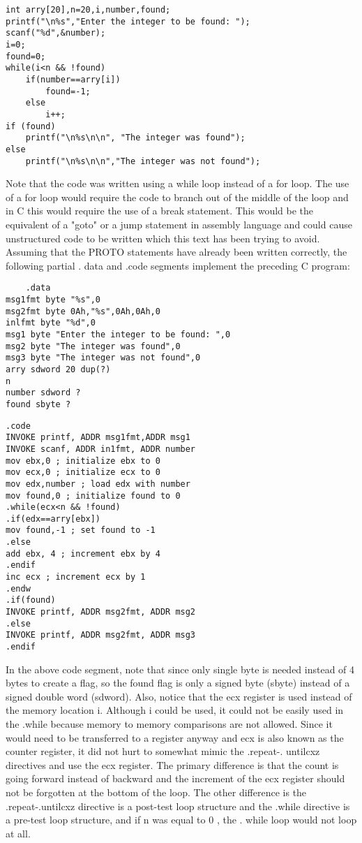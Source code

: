 \documentclass[10pt]{article}
\begin{document}
\begin{verbatim}
int arry[20],n=20,i,number,found;
printf("\n%s","Enter the integer to be found: ");
scanf("%d",&number);
i=0;
found=0;
while(i<n && !found)
    if(number==arry[i])
        found=-1;
    else
        i++;
if (found)
    printf("\n%s\n\n", "The integer was found");
else
    printf("\n%s\n\n","The integer was not found");
\end{verbatim}

Note that the code was written using a while loop instead of a for loop. The use of a for loop would require the code to branch out of the middle of the loop and in C this would require the use of a break statement. This would be the equivalent of a "goto" or a jump statement in assembly language and could cause unstructured code to be written which this text has been trying to avoid. Assuming that the PROTO statements have already been written correctly, the following partial . data and .code segments implement the preceding C program:

\begin{verbatim}
    .data
msg1fmt byte "%s",0
msg2fmt byte 0Ah,"%s",0Ah,0Ah,0
inlfmt byte "%d",0
msg1 byte "Enter the integer to be found: ",0
msg2 byte "The integer was found",0
msg3 byte "The integer was not found",0
arry sdword 20 dup(?)
n
number sdword ?
found sbyte ?
\end{verbatim}

\begin{verbatim}
.code
INVOKE printf, ADDR msg1fmt,ADDR msg1
INVOKE scanf, ADDR in1fmt, ADDR number
mov ebx,0 ; initialize ebx to 0
mov ecx,0 ; initialize ecx to 0
mov edx,number ; load edx with number
mov found,0 ; initialize found to 0
.while(ecx<n && !found)
.if(edx==arry[ebx])
mov found,-1 ; set found to -1
.else
add ebx, 4 ; increment ebx by 4
.endif
inc ecx ; increment ecx by 1
.endw
.if(found)
INVOKE printf, ADDR msg2fmt, ADDR msg2
.else
INVOKE printf, ADDR msg2fmt, ADDR msg3
.endif
\end{verbatim}

In the above code segment, note that since only single byte is needed instead of 4 bytes to create a flag, so the found flag is only a signed byte (sbyte) instead of a signed double word (sdword). Also, notice that the ecx register is used instead of the memory location i. Although i could be used, it could not be easily used in the .while because memory to memory comparisons are not allowed. Since it would need to be transferred to a register anyway and ecx is also known as the counter register, it did not hurt to somewhat mimic the .repeat-. untilcxz directives and use the ecx register. The primary difference is that the count is going forward instead of backward and the increment of the ecx register should not be forgotten at the bottom of the loop. The other difference is the .repeat-.untilcxz directive is a post-test loop structure and the .while directive is a pre-test loop structure, and if n was equal to 0 , the . while loop would not loop at all.
\end{document}
